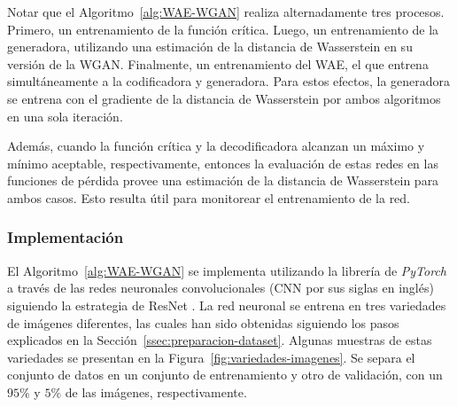 Notar que el Algoritmo~\ref{alg:WAE-WGAN} realiza alternadamente tres procesos. Primero, un entrenamiento de la función crítica. Luego, un entrenamiento de la generadora, utilizando una estimación de la distancia de Wasserstein en su versión de la WGAN. Finalmente, un entrenamiento del WAE, el que entrena simultáneamente a la codificadora y generadora. Para estos efectos, la generadora se entrena con el gradiente de la distancia de Wasserstein por ambos algoritmos en una sola iteración.


Además, cuando la función crítica y la decodificadora alcanzan un máximo y mínimo aceptable, respectivamente, entonces la evaluación de estas redes en las funciones de pérdida provee una estimación de la distancia de Wasserstein para ambos casos. Esto resulta útil para monitorear el entrenamiento de la red.

\subsubsection{Implementación}\label{sssec:wae-wgan-implementacion}  %

El Algoritmo~\ref{alg:WAE-WGAN} se implementa utilizando la librería de \textit{PyTorch} \cite{paszke2019pytorch} a través de las redes neuronales convolucionales (CNN por sus siglas en inglés) siguiendo la estrategia de ResNet \cite{he2016deep}. La red neuronal se entrena en tres variedades de imágenes diferentes, las cuales han sido obtenidas siguiendo los pasos explicados en la Sección~\ref{ssec:preparacion-dataset}. Algunas muestras de estas variedades se presentan en la Figura~\ref{fig:variedades-imagenes}. Se separa el conjunto de datos en un conjunto de entrenamiento y otro de validación, con un $95\%$ y $5\%$ de las imágenes, respectivamente.

